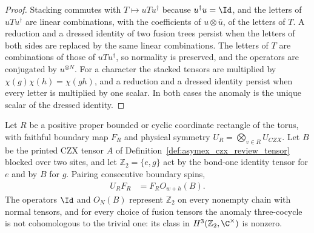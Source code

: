 \begin{proof}\leanok
    Stacking commutes with $T\mapsto uTu^\dagger$ because $u^\dagger u=\Id$,
    and the letters of $uTu^\dagger$ are linear combinations, with the
    coefficients of $u\otimes\bar u$, of the letters of $T$. A reduction and a
    dressed identity of two fusion trees persist when the letters of both
    sides are replaced by the same linear combinations. The letters of $T$ are
    combinations of those of $uTu^\dagger$, so normality is preserved, and the
    operators are conjugated by $u^{\otimes N}$. For a character the stacked
    tensors are multiplied by $\chi(g)\chi(h)=\chi(gh)$, and a reduction and a
    dressed identity persist when every letter is multiplied by one scalar.
    In both cases the anomaly is the unique scalar of the dressed identity.
\end{proof}

\begin{lemma}%
    \label{thm:czx_boundary_anomaly}
    \leanok
    Let $R$ be a positive proper bounded or cyclic coordinate rectangle of the
    torus, with faithful boundary map $F_R$ and physical symmetry
    $U_R=\bigotimes_{v\in R}U_{CZX}$. Let $B$ be the printed CZX tensor $A$
    of Definition~\ref{def:asymex_czx_review_tensor} blocked over two sites,
    and let $\mathbb Z_2=\{e,g\}$ act by the bond-one identity tensor for $e$
    and by $B$ for $g$. Pairing consecutive boundary spins,
    \begin{align}
        U_RF_R & =F_RO_{w+h}(B).
        \label{eq:czx_boundary_anomaly}
    \end{align}
    The operators $\Id$ and $O_N(B)$ represent $\mathbb Z_2$ on every nonempty
    chain with normal tensors, and for every choice of fusion tensors the
    anomaly three-cocycle is not cohomologous to the trivial one: its class in
    $H^3(\mathbb Z_2,\C^\times)$ is nonzero.
\end{lemma}

